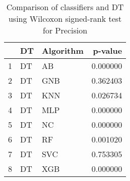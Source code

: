 \begin{table}
\footnotesize
\caption{Comparison of classifiers and DT using Wilcoxon signed-rank test for Precision}
\label{tab:DT wilcoxon Precision comparison}
\begin{tabular}{lllr}
\hline
 & DT & Algorithm & p-value \\
\hline
1 & DT & AB & 0.000000 \\
2 & DT & GNB & 0.362403 \\
3 & DT & KNN & 0.026734 \\
4 & DT & MLP & 0.000000 \\
5 & DT & NC & 0.000000 \\
6 & DT & RF & 0.001020 \\
7 & DT & SVC & 0.753305 \\
8 & DT & XGB & 0.000000 \\
\hline
\end{tabular}
\end{table}
